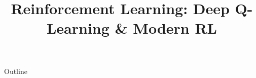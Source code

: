 \documentclass[xcolor=dvipsnames,compress,t,pdf,9pt]{beamer}
\title[\insertframenumber /\inserttotalframenumber]{Reinforcement Learning: Deep Q-Learning \& Modern RL}
\begin{document}
	\begin{frame}
	\titlepage
	\end{frame}

	\begin{frame}{Outline}
	    \tableofcontents
	\end{frame}

	
	
	
\end{document}
